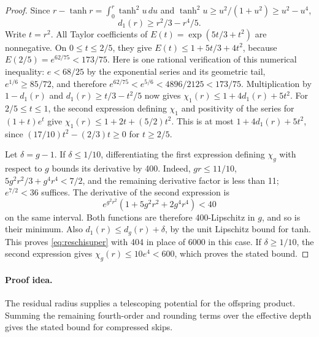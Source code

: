 \begin{proof}
Since $r-\tanh r=\int_0^r\tanh^2u\,du$ and
$\tanh^2u\ge u^2/(1+u^2)\ge u^2-u^4$,
\[
d_1(r)\ge r^2/3-r^4/5.
\]
Write $t=r^2$. All Taylor coefficients of
$E(t)=\exp(5t/3+t^2)$ are nonnegative. On $0\le t\le2/5$,
they give $E(t)\le1+5t/3+4t^2$, because
$E(2/5)=e^{62/75}<173/75$.
Here is one rational verification of this numerical inequality:
$e<68/25$ by the exponential series and its geometric tail,
$e^{1/6}\ge85/72$, and therefore
$e^{62/75}<e^{5/6}<4896/2125<173/75$.
Multiplication by $1-d_1(r)$ and
$d_1(r)\ge t/3-t^2/5$ now gives
$\chi_1(r)\le1+4d_1(r)+5t^2$.
For $2/5\le t\le1$, the second expression defining $\chi_1$
and positivity of the series for $(1+t)e^t$ give
$\chi_1(r)\le1+2t+(5/2)t^2$.
This is at most $1+4d_1(r)+5t^2$, since
$(17/10)t^2-(2/3)t\ge0$ for $t\ge2/5$.

Let $\delta=g-1$. If $\delta\le1/10$, differentiating the first
expression defining $\chi_g$ with respect to $g$ bounds its
derivative by 400. Indeed, $gr\le11/10$,
$5g^2r^2/3+g^4r^4<7/2$, and the remaining derivative factor is
less than 11; $e^{7/2}<36$ suffices.
The derivative of the second expression is
\[
e^{g^2r^2}(1+5g^2r^2+2g^4r^4)<40
\]
on the same interval. Both functions are therefore
400-Lipschitz in $g$, and so is their minimum.
Also $d_1(r)\le d_g(r)+\delta$, by the unit Lipschitz bound for
tanh. This proves \eqref{eq:reschisuper} with 404 in place of 6000
in this case. If $\delta\ge1/10$, the second expression gives
$\chi_g(r)\le10e^4<600$, which proves the stated bound.
\end{proof}

\paragraph{Proof idea.}
The residual radius supplies a telescoping potential for the offspring
product. Summing the remaining fourth-order and rounding terms over the
effective depth gives the stated bound for compressed skips.

